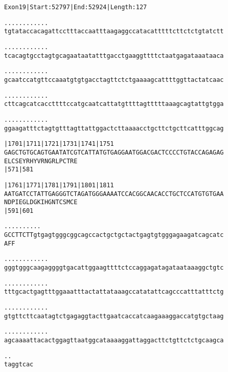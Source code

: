 \documentclass{article}
\begin{document}
\newpage
\begin{alltt}
Exon 19 | Start: 52797 | End: 52924 | Length: 127

.    .    .    .    .    .    .    .    .    .    .    .
tgtataccacagattcctttaccaatttaagaggccatacatttttcttctctgtatctt



.    .    .    .    .    .    .    .    .    .    .    .
tcacagtgcctagtgcagaataatatttgacctgaaggttttctaatgagataaataaca



.    .    .    .    .    .    .    .    .    .    .    .
gcaatccatgttccaaatgtgtgacctagttctctgaaaagcattttggttactatcaac



.    .    .    .    .    .    .    .    .    .    .    .
cttcagcatcaccttttccatgcaatcattatgttttagtttttaaagcagtattgtgga



.    .    .    .    .    .    .    .    .    .    .    .
ggaagatttctagtgtttagttattggactcttaaaacctgcttctgcttcatttggcag



        |1701     |1711     |1721     |1731     |1741     |1751
GAGCTGTGCAGTGAATATCGTCATTATGTGAGGAATGGACGACTCCCCTGTACCAGAGAG
E  L  C  S  E  Y  R  H  Y  V  R  N  G  R  L  P  C  T  R  E
                  |571                          |581

        |1761     |1771     |1781     |1791     |1801     |1811
AATGATCCTATTGAGGGTCTAGATGGGAAAATCCACGGCAACACCTGCTCCATGTGTGAA
N  D  P  I  E  G  L  D  G  K  I  H  G  N  T  C  S  M  C  E
                  |591                          |601

            .    .    .    .    .    .    .    .    .    .
GCCTTCTTgtgagtgggcggcagccactgctgctactgagtgtgggagaagatcagcatc
A  F  F


\end{alltt}
\newpage
\begin{alltt}
  .    .    .    .    .    .    .    .    .    .    .    .
gggtgggcaagaggggtgacattggaagttttctccaggagatagataataaaggctgtc



  .    .    .    .    .    .    .    .    .    .    .    .
tttgcactgagtttggaaatttactattataaagccatatattcagcccatttatttctg



  .    .    .    .    .    .    .    .    .    .    .    .
gtgttcttcaatagtctgagaggtacttgaatcaccatcaagaaaggaccatgtgctaag



  .    .    .    .    .    .    .    .    .    .    .    .
agcaaaattacactggagttaatggcataaaaggattaggacttctgttctctgcaagca



  .    .
taggtcac


\end{alltt}
\end{document}
